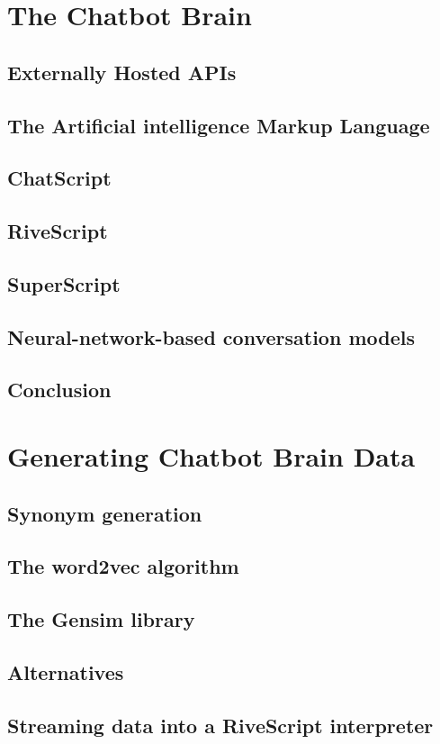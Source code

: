 \documentclass[12pt, twoside, a4paper, draft]{report}
\begin{document}
\section{The Chatbot Brain}
\subsection{Externally Hosted APIs}
\subsection{The Artificial intelligence Markup Language}
\subsection{ChatScript}
\subsection{RiveScript}
\subsection{SuperScript}
\subsection{Neural-network-based conversation models}
\subsection{Conclusion}
\section{Generating Chatbot Brain Data}
\subsection{Synonym generation}
\subsection{The word2vec algorithm}
\subsection{The Gensim library}
\subsection{Alternatives}
\subsection{Streaming data into a RiveScript interpreter}
\end{document}
